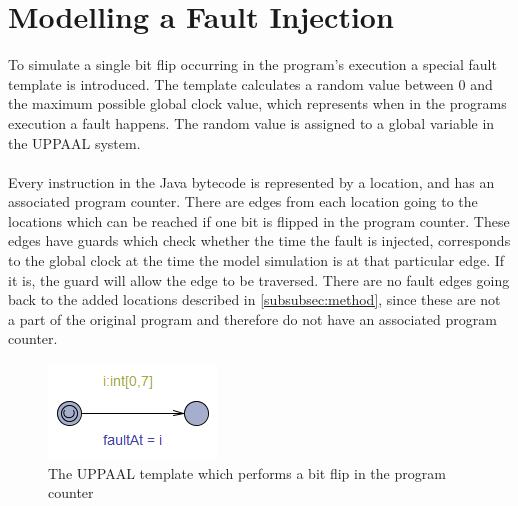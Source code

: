 \section{Modelling a Fault Injection}
To simulate a single bit flip occurring in the program's execution a special fault template is introduced. The template calculates a random value between $0$ and the maximum possible global clock value, which represents when in the programs execution a fault happens. The random value is assigned to a global variable in the UPPAAL system.\\\\
Every instruction in the Java bytecode is represented by a location, and has an associated program counter. There are edges from each location going to the locations which can be reached if one bit is flipped in the program counter. These edges have guards which check whether the time the fault is injected, corresponds to the global clock at the time the model simulation is at that particular edge. If it is, the guard will allow the edge to be traversed. There are no fault edges going back to the added locations described in \cref{subsubsec:method}, since these are not a part of the original program and therefore do not have an associated program counter.
\begin{figure}[H]
\centering
\includegraphics{figures/fault.PNG}
\caption{The UPPAAL template which performs a bit flip in the program counter}
\end{figure}

